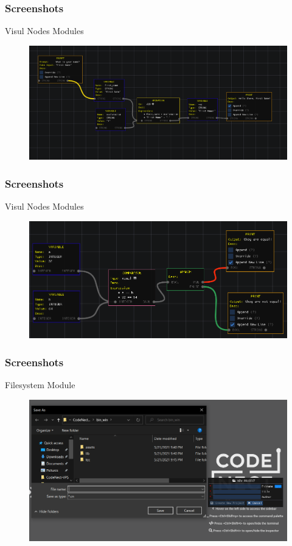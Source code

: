 \documentclass{beamer}
\begin{document}
\begin{frame}
	\frametitle{Screenshots}
	\begin{block}{Visul Nodes Modules}
		\begin{figure}
			\includegraphics[width=1\textwidth]{../tex/media/sc_node_interface.png}
		\end{figure}
	\end{block}
\end{frame}

\begin{frame}
	\frametitle{Screenshots}
	\begin{block}{Visul Nodes Modules}
		\begin{figure}
			\includegraphics[width=1\textwidth]{../tex/media/sc_sample_branch.png}
		\end{figure}
	\end{block}
\end{frame}

\begin{frame}
	\frametitle{Screenshots}
	\begin{block}{Filesystem Module}
		\begin{figure}
			\includegraphics[width=1\textwidth]{../tex/media/sc_new_project.png}
		\end{figure}
	\end{block}
\end{frame}
\end{document}
